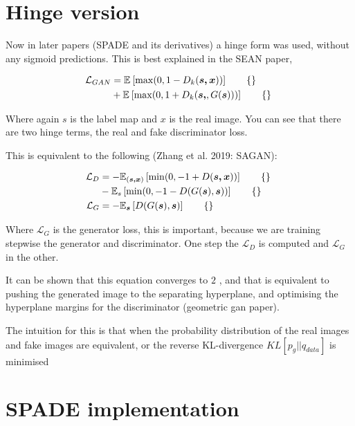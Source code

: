 \documentclass{memoir}
\begin{document}
\section{Hinge version}
\label{sec:orgcab05ed}

Now in later papers (SPADE and its derivatives) a hinge form was used, without
any sigmoid predictions. This is best explained in the SEAN paper,

\begin{align}
\mathcal{ L }_{GAN} &= \mathbb{E}_{} \left[ \max(0,1 - D_{k}(\boldsymbol{s,x})) \right] \tag*{\{\} }\\
 &+ \mathbb{E}_{} \left[ \max(0, 1 + D_{k}(\boldsymbol{s,},G(\boldsymbol{s}))) \right] \tag*{\{\} }
\end{align}

Where again \(s\) is the label map and \(x\) is the real image. You can see
that there are two hinge terms, the real and fake discriminator loss.

This is equivalent to the following (Zhang et al. 2019: SAGAN):

\begin{align}
\mathcal{ L }_{D} &= - \mathbb{E}_{(\boldsymbol{s,x})} \left[ \min(0, -1 + D(\boldsymbol{s,x})) \right] \tag*{\{\} }\\
 &- \mathbb{E}_{s} \left[ \min(0, -1 - D(G(\boldsymbol{s}) , \boldsymbol{s})) \right] \tag*{\{\} }\\
\mathcal{ L }_{G} &= - \mathbb{E}_{\boldsymbol{s} } \left[ D(G(\boldsymbol{s}) , \boldsymbol{s}) \right] \tag*{\{\} }
\end{align}

Where \(\mathcal{ L }_{G}\) is the generator loss, this is important, because
we are training stepwise the generator and discriminator. One step the
\(\mathcal{ L }_{D}\) is computed and \(\mathcal{ L }_{G}\) in the other.


It can be shown that this equation converges to \(2\) , and that is equivalent
to pushing the generated image to the separating hyperplane, and optimising the
hyperplane margins for the discriminator (geometric gan paper).

The intuition for this is that when the probability distribution of the real
images and fake images are equivalent, or the reverse KL-divergence \(KL \left[ p_{g} || q_{data}\right]\)
is minimised \cite{miyatoSpectralNormalizationGenerative2018}

\section{SPADE implementation}
\label{sec:orgb1283f7}
\end{document}
